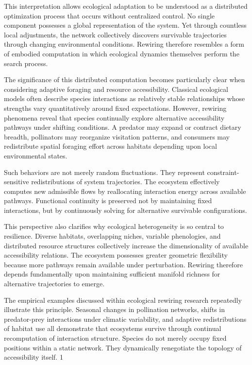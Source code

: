 \documentclass[11pt,a4paper]{article}
\begin{document}
This interpretation allows ecological adaptation to be understood as a distributed optimization process that occurs without centralized control. No single component possesses a global representation of the system. Yet through countless local adjustments, the network collectively discovers survivable trajectories through changing environmental conditions. Rewiring therefore resembles a form of embodied computation in which ecological dynamics themselves perform the search process.

The significance of this distributed computation becomes particularly clear when considering adaptive foraging and resource accessibility. Classical ecological models often describe species interactions as relatively stable relationships whose strengths vary quantitatively around fixed expectations. However, rewiring phenomena reveal that species continually explore alternative accessibility pathways under shifting conditions. A predator may expand or contract dietary breadth, pollinators may reorganize visitation patterns, and consumers may redistribute spatial foraging effort across habitats depending upon local environmental states.

Such behaviors are not merely random fluctuations. They represent constraint-sensitive redistributions of system trajectories. The ecosystem effectively computes new admissible flows by reallocating interaction energy across available pathways. Functional continuity is preserved not by maintaining fixed interactions, but by continuously solving for alternative survivable configurations.

This perspective also clarifies why ecological heterogeneity is so central to resilience. Diverse habitats, overlapping niches, variable phenologies, and distributed resource structures collectively increase the dimensionality of available accessibility relations. The ecosystem possesses greater geometric flexibility because more pathways remain available under perturbation. Rewiring therefore depends fundamentally upon maintaining sufficient manifold richness for alternative trajectories to emerge.

The empirical examples discussed within ecological rewiring research repeatedly illustrate this principle. Seasonal changes in pollination networks, shifts in predator-prey interactions under climatic variability, and adaptive redistributions of habitat use all demonstrate that ecosystems survive through continual recomputation of interaction structure. Species do not merely occupy fixed positions within a static network. They dynamically renegotiate the topology of accessibility itself. 1
\end{document}
